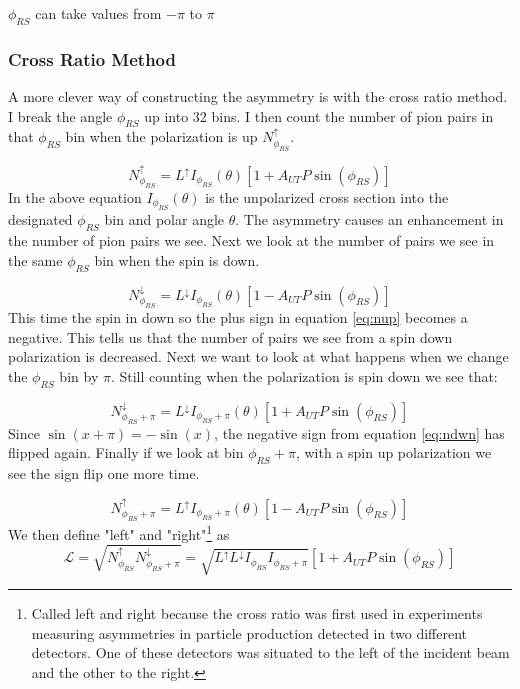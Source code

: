 \documentclass[abstract = on,listof=totoc, bibliography=totoc]{scrreprt}
\begin{document}
$\phi_{RS}$ can take values from $-\pi$ to $\pi$



\subsubsection{Cross Ratio Method}

A more clever way of constructing the asymmetry is with the cross ratio method. I break the angle $\phi_{RS}$ up into 32 bins. I then count the number of pion pairs in that $\phi_{RS}$ bin when the polarization is up $N^\uparrow_{\phi_{RS}}$. 

\begin{equation}
\label{eq:nup}
N^\uparrow_{\phi_{RS}} = L^\uparrow I_{\phi_{RS}}(\theta)\left[1+A_{UT}P\sin(\phi_{RS})\right]
\end{equation}
%
In the above equation $I_{\phi_{RS}}(\theta)$ is the unpolarized cross section into the designated  
$\phi_{RS}$ bin and polar angle $\theta$. The asymmetry causes an enhancement in the number of pion pairs we see. Next we look at the number of pairs we see in the same $\phi_{RS}$ bin when the spin is down.

\begin{equation}
\label{eq:ndwn}
N^\downarrow_{\phi_{RS}} = L^\downarrow I_{\phi_{RS}}(\theta)\left[1-A_{UT}P\sin(\phi_{RS})\right]
\end{equation}
%
This time the spin in down so the plus sign in equation \ref{eq:nup} becomes a negative. This tells us that the number of pairs we see from a spin down polarization is decreased. 
Next we want to look at what happens when we change the $\phi_{RS}$ bin by $\pi$. Still counting when the polarization is spin down we see that:

\begin{equation}
N^\downarrow_{\phi_{RS}+\pi} = L^\downarrow I_{\phi_{RS}+\pi}(\theta)\left[1+A_{UT}P\sin(\phi_{RS})\right]
\end{equation}
%
Since $\sin(x+\pi) = -\sin(x)$, the negative sign from equation \ref{eq:ndwn} has flipped again. Finally if we look at bin $\phi_{RS} + \pi$, with a spin up polarization we see the sign flip one more time. 

\begin{equation}
N^\uparrow_{\phi_{RS}+\pi} = L^\uparrow I_{\phi_{RS}+\pi}(\theta)\left[1-A_{UT}P\sin(\phi_{RS})\right]
\end{equation}
%
We then define "left" and "right"\footnote{Called left and right because the cross ratio was first used in experiments measuring asymmetries in particle production detected in two different detectors. One of these detectors was situated to the left of the incident beam and the other to the right.} as 
\begin{equation}
\mathcal{L} = \sqrt{N^\uparrow_{\phi_{RS}}N^\downarrow_{\phi_{RS}+\pi}}  = \sqrt{L^\uparrow L^\downarrow I_{\phi_{RS}} I_{\phi_{RS}+\pi}} \left[ 1+A_{UT}P\sin(\phi_{RS})\right]
\end{equation}
\end{document}
